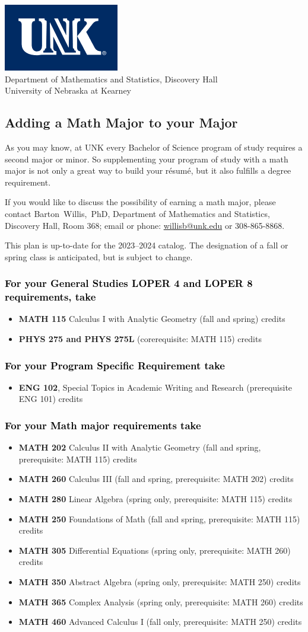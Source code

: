 \documentclass[11pt]{article}
\makeatletter
\newcommand{\calcone}{\textbf{MATH 115} Calculus I with Analytic Geometry (fall and spring) \dotfill 5 credits}
\newcommand{\calconeshort}{MATH 115}
\newcommand{\calctwo}{\textbf{MATH 202} Calculus II with Analytic Geometry (fall and spring, prerequisite: MATH 115) \dotfill 5 credits }
\newcommand{\foundations}{\textbf{MATH 250} Foundations of Math (fall and spring, prerequisite: MATH 115)  \dotfill 3 credits}
\newcommand{\calcthree}{\textbf{MATH 260} Calculus III  (fall and spring, prerequisite: MATH 202) \dotfill 5 credits}
\newcommand{\linear}{\textbf{MATH 280} Linear Algebra (spring only, prerequisite: MATH 115) \dotfill 3 credits}
\newcommand{\diffeq}{\textbf{MATH 305}	Differential Equations (spring only, prerequisite: MATH 260) \dotfill 	3 credits}
\newcommand{\abstractalgebra}{\textbf{MATH 350}	Abstract Algebra (spring only, prerequisite: MATH 250) \dotfill 	3 credits}
\newcommand{\complex}{\textbf{MATH 365}	Complex Analysis (spring only,  prerequisite: MATH 260) \dotfill 3 credits}
\newcommand{\advancedcalc}{\textbf{MATH 460}	Advanced Calculus I  (fall only,   prerequisite: MATH 250) \dotfill 3 credits}
\newcommand{\physics}{\textbf{PHYS 275 and PHYS 275L}  (corerequisite: \calconeshort) \dotfill 5 credits}
\newcommand{\contactbw}{\mbox{Barton Willis, PhD}, Department of Mathematics and Statistics,  Discovery Hall, Room 368;
email or phone: \href{mailto:willisb@unk.edu}{willisb@unk.edu} or 308-865-8868.}
\newcommand{\forinfo}[2]{If you would like to discuss the possibility of earning a math {#1}, please contact \contactbw}
\newcommand{\catalog}{2023--2024 }
\newcommand{\LOPER}{LOPER\xspace}
\newcommand{\uptodate}{This plan is up-to-date for  the \catalog catalog. The designation of a fall or spring class is 
anticipated, but  is subject to change.}
\newcommand{\myheading}{
\begin{flushleft}
\includegraphics[scale=0.35]{unk-logo}\\
\setcounter{footnote}{0}
\vspace{0.25in}
 \textcolor{unkblue}{Department of Mathematics and Statistics, Discovery Hall} \\
  \textcolor{unkblue}{University of Nebraska at Kearney}
\end{flushleft}}
\makeatother
\begin{document}
\newpage

\myheading


\subsection*{\textbf{\textcolor{unkblue}{Adding a Math Major to your Major}}}

As you may know, at UNK every Bachelor of Science program of study requires a second
major or minor. So supplementing your  program of study with a math major is not only a great
way to build your r\'esum\'e, but it also fulfills a degree requirement.


\forinfo{major}{program of study}

\uptodate

\subsubsection*{\textcolor{black}{For your General Studies \LOPER 4  and  \LOPER 8 requirements, take}}
\begin{itemize}
\item \calcone
   \item \physics 
\end{itemize}
\vspace{-0.1in}
\subsubsection*{\textcolor{black}{For your Program Specific Requirement take}}
\begin{itemize}
   \item \textbf{ENG 102}, Special Topics in Academic Writing and Research (prerequisite ENG 101)   credits
\end{itemize}

\subsubsection*{\textcolor{black}{For your Math major requirements take}}
\begin{itemize}
  \item \calctwo
  \item \calcthree
  \item \linear
\item \foundations
\item \diffeq
\item \abstractalgebra
\item \complex

\item \advancedcalc
\end{itemize}
\end{document}
